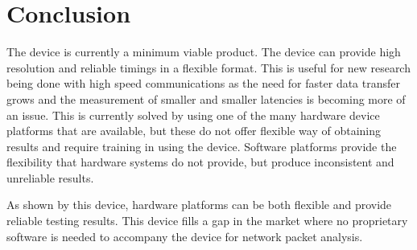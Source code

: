 \section{Conclusion}

The device is currently a minimum viable product. The device can provide high resolution and reliable timings in a 
flexible format.  This is useful for new research being done with high speed communications as the need for faster 
data transfer grows and the measurement of smaller and smaller latencies is becoming more of an issue. This is 
currently solved by using one of the many hardware device platforms that are available, but these do not offer 
flexible way of obtaining results and require training in using the device.  Software platforms provide the 
flexibility that hardware systems do not provide, but produce inconsistent and unreliable results.

As shown by this device, hardware platforms can be both flexible and provide reliable testing results. This device 
fills a gap in the market where no proprietary software is needed to accompany the device for network packet analysis. 
